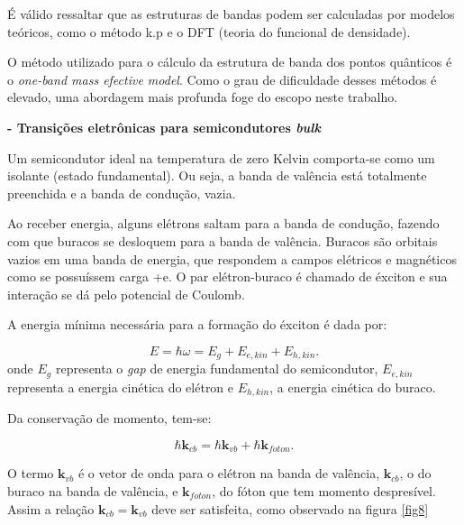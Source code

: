 		\par É válido ressaltar que  as estruturas de bandas podem ser calculadas por modelos teóricos, como o método k.p e o DFT (teoria do funcional de densidade).

		\par O método utilizado para o cálculo da estrutura de banda dos pontos quânticos é o \textit{one-band mass efective model}\cite{bulk2}. Como o  grau de dificuldade desses métodos é elevado, uma abordagem mais profunda foge do escopo neste trabalho.

	\par \textbf{- Transições eletrônicas para semicondutores \textit{bulk}}

		\par Um semicondutor ideal na temperatura de zero Kelvin comporta-se como um isolante (estado fundamental). Ou seja, a banda de valência está totalmente preenchida e a banda de condução, vazia.
 		
 		\par Ao receber energia, alguns elétrons saltam para a banda de condução, fazendo com que buracos se desloquem para a banda de valência\cite{bloch1}. Buracos são orbitais vazios em uma banda de energia, que respondem a campos elétricos e magnéticos como se possuíssem carga +e\cite{qm_fis6}. O par elétron-buraco é chamado de éxciton e sua interação se dá pelo potencial de Coulomb\cite{bloch1}.

 		\par A energia mínima necessária para a formação do éxciton é dada por:

 		\begin{equation}
 			\label{bandas_1}
 			E = \hbar \omega = E_{g} + E_{e, kin} + E_{h, kin}.
 		\end{equation}
 		onde $E_{g}$ representa o \textit{gap} de energia fundamental do semicondutor, $E_{e,kin}$ representa a energia cinética do elétron e $E_{h,kin}$, a energia cinética do buraco.

 		\par Da conservação de momento, tem-se:

 		\begin{equation}
 			\label{bandas_2}
 			\hbar \mathbf{k}_{cb} = \hbar \mathbf{k}_{vb} + \hbar \mathbf{k}_{foton}.
 		\end{equation}

 		\par O termo $\mathbf{k}_{vb}$ é o vetor de onda para o elétron na banda de valência, $\mathbf{k}_{cb}$, o do buraco na banda de valência, e $\mathbf{k}_{foton}$, do fóton que tem momento despresível. Assim a relação $\mathbf{k}_{cb} = \mathbf{k}_{vb}$ deve ser satisfeita, como observado na figura \ref{fig8}


